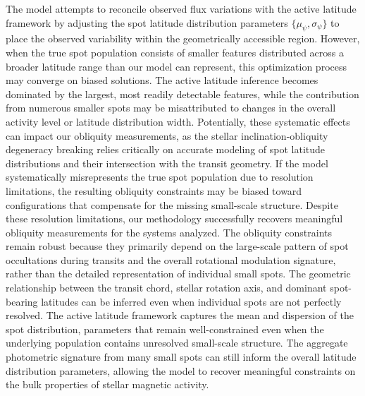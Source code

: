 \documentclass[twocolumn]{aastex631}
\begin{document}
The model attempts to reconcile observed flux variations with the active latitude framework by 
adjusting the spot latitude distribution parameters $\{\mu_\psi, \sigma_\psi\}$ to place the observed variability 
within the geometrically accessible region. However, when the true spot population consists of smaller 
features distributed across a broader latitude range than our model can represent, this optimization 
process may converge on biased solutions. The active latitude inference becomes dominated by the largest, 
most readily detectable features, while the contribution from numerous smaller spots may be misattributed to 
changes in the overall activity level or latitude distribution width. Potentially, these systematic effects can impact 
our obliquity measurements, as the stellar inclination-obliquity degeneracy breaking relies critically on 
accurate modeling of spot latitude distributions and their intersection with the transit geometry. If the model 
systematically misrepresents the true spot population due to resolution limitations, the resulting obliquity constraints 
may be biased toward configurations that compensate for the missing small-scale structure. Despite these resolution 
limitations, our methodology successfully recovers meaningful obliquity measurements for the systems analyzed. 
The obliquity constraints remain robust because they primarily depend on the large-scale pattern of 
spot occultations during transits and the overall rotational modulation signature, 
rather than the detailed representation of individual small spots. The geometric relationship between the 
transit chord, stellar rotation axis, and dominant spot-bearing latitudes can be 
inferred even when individual spots are not perfectly resolved. The active latitude framework captures the mean and 
dispersion of the spot distribution, parameters that remain well-constrained even when the underlying population 
contains unresolved small-scale structure. The aggregate photometric signature from many small spots can still inform the 
overall latitude distribution parameters, allowing the model to recover meaningful constraints on the bulk 
properties of stellar magnetic activity.


\end{document}
